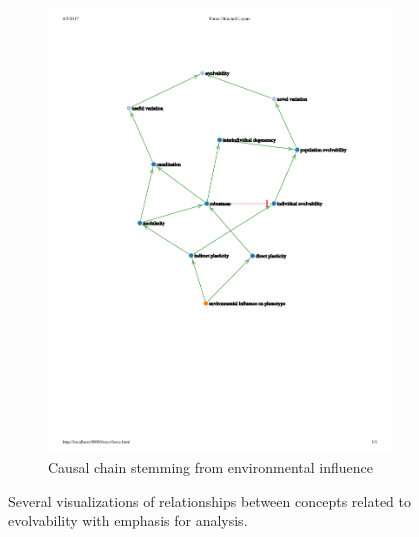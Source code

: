 \begin{figure}
\begin{subfigure}[b]{0.45\textwidth}
        \includegraphics[width=\textwidth]{img/environmental-influence}
        \caption{Causal chain stemming from environmental influence}
        \label{subfig:mindmap_environmental-influence}
    \end{subfigure}
  \captionsetup{singlelinecheck=off,justification=raggedright}
  \caption[Alternate Visualizations of Interplay Between Concepts Related to Evolvability]{Several visualizations of relationships between concepts related to evolvability with emphasis for analysis.}
  \label{fig:mindmap_analysis}
\end{figure}